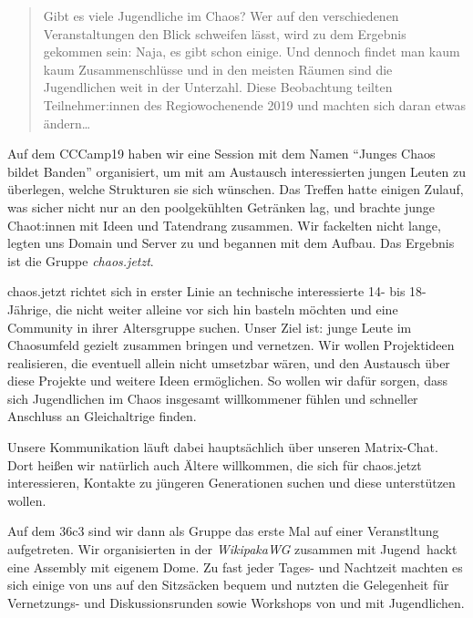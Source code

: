 \begin{DSarticle}[
    title={chaos.jetzt},
    author=ruru4143, email=ruru-cj-ds@r3.at,
    head=chaos.jetzt,
    tocentry=chaos.jetzt,
]

\begin{abstract}
Gibt es viele Jugendliche im Chaos?
Wer auf den verschiedenen Veranstaltungen den Blick schweifen lässt, wird zu dem Ergebnis gekommen sein:
Naja, es gibt schon einige.
Und dennoch findet man kaum kaum Zusammenschlüsse und in den meisten Räumen sind die Jugendlichen weit in der Unterzahl.
Diese Beobachtung teilten Teilnehmer:innen des Regiowochenende 2019 und machten sich daran etwas ändern\ldots
\end{abstract}


Auf dem CCCamp19 haben wir eine Session mit dem Namen \enquote{Junges Chaos bildet Banden} organisiert, um mit am Austausch interessierten
jungen Leuten zu überlegen, welche Strukturen sie sich wünschen.
Das Treffen hatte einigen Zulauf, was sicher nicht nur an den poolgekühlten Getränken lag, und brachte junge Chaot:innen mit Ideen und Tatendrang zusammen.
Wir fackelten nicht lange, legten uns Domain und Server zu und begannen mit dem Aufbau. Das Ergebnis ist die Gruppe \emph{chaos.jetzt}.

chaos.jetzt richtet sich in erster Linie an technische interessierte 14- bis 18-Jährige, die nicht weiter alleine vor sich hin basteln möchten und eine Community in ihrer Altersgruppe suchen.
Unser Ziel ist: junge Leute im Chaosumfeld gezielt zusammen bringen und vernetzen.
Wir wollen Projektideen realisieren, die eventuell allein nicht umsetzbar wären, und den Austausch über diese Projekte und weitere Ideen ermöglichen.
So wollen wir dafür sorgen, dass sich Jugendlichen im Chaos insgesamt willkommener fühlen und schneller Anschluss an Gleichaltrige finden.

Unsere Kommunikation läuft dabei hauptsächlich über unseren Matrix-Chat.
Dort heißen wir natürlich auch Ältere willkommen, die sich für chaos.jetzt interessieren, Kontakte zu jüngeren Generationen suchen und diese unterstützen wollen.

Auf dem 36c3 sind wir dann als Gruppe das erste Mal auf einer Veranstltung aufgetreten. Wir organisierten in der \emph{WikipakaWG} zusammen mit Jugend~hackt eine Assembly mit eigenem Dome.
Zu fast jeder Tages- und Nachtzeit machten es sich einige von uns auf den Sitzsäcken bequem und nutzten die Gelegenheit für Vernetzungs- und Diskussionsrunden sowie Workshops von und mit Jugendlichen.


\end{DSarticle}
